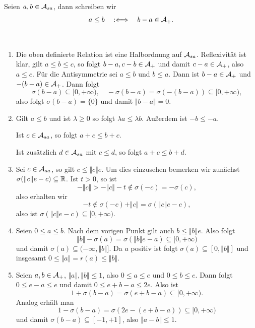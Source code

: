 \begin{definition}
    Seien $a, b \in \mathcal{A}_{sa}$, dann schreiben wir
    $$ a \leq b \quad :\Longleftrightarrow \quad b - a \in \mathcal{A}_+. $$
\end{definition}

\begin{remark}{\ }
    \begin{enumerate}
        \item Die oben definierte Relation ist eine Halbordnung auf $\mathcal{A}_{sa}$. Reflexivität ist klar, gilt $a \leq b \leq c$, so folgt $b - a, c - b \in \mathcal{A}_+$ und damit $c - a \in \mathcal{A}_+$, also $a \leq c$. Für die Antisymmetrie sei $a \leq b$ und $b \leq a$. Dann ist $b - a \in \mathcal{A}_+$ und $-(b-a) \in \mathcal{A}_+$. Dann folgt
        $$ \sigma(b-a) \subseteq [0, +\infty), \quad -\sigma(b-a) = \sigma(-(b-a)) \subseteq [0, +\infty), $$
        also folgt $\sigma(b-a) = \{ 0 \}$ und damit $\Vert b - a \Vert = 0$.

        \item Gilt $a \leq b$ und ist $\lambda \geq 0$ so folgt $\lambda a \leq \lambda b$. Außerdem ist $-b \leq -a$.
        
        Ist $c \in \mathcal{A}_{sa}$, so folgt $a + c \leq b + c$.

        Ist zusätzlich $d \in \mathcal{A}_{sa}$ mit $c \leq d$, so folgt $a + c \leq b + d$.

        \item Sei $c \in \mathcal{A}_{sa}$, so gilt $c \leq \Vert c \Vert e$. Um dies einzusehen bemerken wir zunächst $\sigma(\Vert c \Vert e - c) \subseteq \mathbb{R}$. Ist $t>0$, so ist
        $$ -\Vert c \Vert > -\Vert c \Vert - t \notin \sigma(-c) = -\sigma(c), $$
        also erhalten wir
        $$ -t \notin \sigma(-c) + \Vert c \Vert = \sigma(\Vert c \Vert e - c), $$
        also ist $\sigma(\Vert c \Vert e - c) \subseteq [0, +\infty)$.

        \item Seien $0 \leq a \leq b$. Nach dem vorigen Punkt gilt auch $b \leq \Vert b \Vert e$. Also folgt
        $$ \Vert b \Vert - \sigma(a) = \sigma(\Vert b \Vert e - a) \subseteq [0, +\infty) $$
        und damit $\sigma(a) \subseteq (-\infty, \Vert b \Vert]$. Da $a$ positiv ist folgt $\sigma(a) \subseteq [0, \Vert b \Vert]$ und insgesamt $0 \leq \Vert a \Vert = r(a) \leq \Vert b \Vert$.

        \item Seien $a, b \in \mathcal{A}_+$, $\Vert a \Vert, \Vert b \Vert \leq 1$, also $0 \leq a \leq e$ und $0 \leq b \leq e$. Dann folgt $0 \leq e - a \leq e$ und damit $0 \leq e + b - a \leq 2e$. Also ist
        $$ 1 + \sigma(b-a) = \sigma(e + b - a) \subseteq [0, +\infty). $$
        Analog erhält man
        $$ 1 - \sigma(b-a) = \sigma(2e - (e+b-a)) \subseteq [0, +\infty) $$
        und damit $\sigma(b-a) \subseteq [-1, +1]$, also $\Vert a - b \Vert \leq 1$.


\end{enumerate}
\end{remark}
